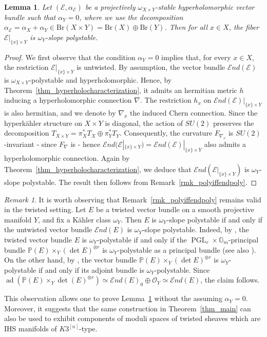 \documentclass[12pt,a4paper]{amsart}
\theoremstyle{plain}
\newtheorem{lem}[thm]{Lemma}
\theoremstyle{definition}
\theoremstyle{remark}
\newtheorem{rmk}[thm]{Remark}
\def\PGL{\operatorname{PGL}}
\newcommand{\kE}{\mathcal{E}}
\newcommand{\Br}{\mathrm{Br}}
\newcommand{\ad}{\operatorname{ad}}
\newcommand{\cEnd}{\mathcal{E}nd}
\begin{document}
\begin{lem}\label{lem_fibersarestable}
Let $(\mathcal{E},\alpha_{\mathcal{E}})$ be a projectively $\omega_{X\times Y}$-stable hyperholomorphic vector bundle such that $\alpha_Y = 0$, where we use the decomposition $\alpha_\kE = \alpha_X + \alpha_Y \in \Br(X\times Y) = \Br(X) \oplus \Br(Y)$. Then for all $x \in X$, the fiber $\kE|_{\{x\}\times Y}$ is $\omega_Y$-slope polystable.
\end{lem}

\begin{proof}
We first observe that the condition $\alpha_Y=0$ implies that, for every
$x\in X$, the restriction $\kE|_{\{x\}\times Y}$ is untwisted. By assumption, the vector bundle $\cEnd(\kE)$ is $\omega_{X\times Y}$-polystable and hyperholomorphic. Hence, by Theorem~\ref{thm_hyperholocharacterization}, it admits an hermitian metric $h$ inducing a hyperholomorphic connection $\nabla$. The restriction $h_x$ on $\cEnd(\kE)|_{\{x\}\times Y}$ is also hermitian, and we denote by $\nabla_x$ the induced Chern connection. Since the hyperk\"ahler structure on $X\times Y$ is diagonal, the action of $SU(2)$ preserves the decomposition $T_{X\times Y} = \pi_X^*T_X \oplus \pi_Y^*T_Y$. Consequently, the curvature $F_{\nabla_x}$ is $SU(2)$-invariant - since $F_{\nabla}$ is - hence $\cEnd(\kE|_{\{x\}\times Y}) = \cEnd(\kE)|_{\{x\}\times Y}$ also admits a hyperholomorphic connection. Again by Theorem~\ref{thm_hyperholocharacterization}, we deduce that $\cEnd(\kE|_{\{x\}\times Y})$ is $\omega_Y$-slope polystable. The result then follows from Remark~\ref{rmk_polyiffendpoly}.
\end{proof}

\begin{rmk}\label{twistedmoduli}
    It is worth observing that Remark~\ref{rmk_polyiffendpoly} remains valid in the twisted setting. Let $E$ be a twisted vector bundle on a smooth projective manifold $Y$, and fix a K\"ahler class $\omega_Y$. Then $E$ is $\omega_Y$-slope polystable if and only if the untwisted vector bundle $\mathcal{E}nd(E)$ is $\omega_Y$-slope polystable. Indeed, by \cite[Lemma 2.1]{connectionontwistedhiggsbundles}, the twisted vector bundle $E$ is $\omega_Y$-polystable if and only if the $\PGL_r\times \mathbb{G}_m$-principal bundle $\mathbb{P}(E)\times_Y(\det E)^{\otimes r}$ is $\omega_Y$-polystable as a principal bundle (see also \cite[Definition~1.1]{anchouche-biswas-einstein-hermitian}). On the other hand, by \cite[Corollary~3.8]{anchouche-biswas-einstein-hermitian}, the vector bundle $\mathbb{P}(E)\times_Y(\det E)^{\otimes r}$ is $\omega_Y$-polystable if and only if its adjoint bundle is $\omega_Y$-polystable. Since $\ad(\mathbb{P}(E)\times_Y\det (E)^{\otimes r})\simeq \mathcal{E}nd(E)_0\oplus \mathcal{O}_Y\simeq \mathcal{E}nd(E)$, the claim follows.
    
    This observation allows one to prove Lemma~\ref{lem_fibersarestable} without the assuming $\alpha_Y=0$. Moreover, it suggests that the same construction in Theorem~\ref{thm_main} can also be used to exhibit components of moduli spaces of twisted sheaves which are IHS manifolds of $K3^{[n]}$-type.
\end{rmk}
\end{document}
